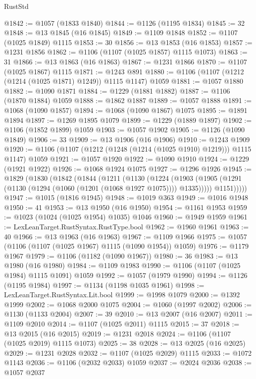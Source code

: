 \begin{lexlean}{RustStd}
\begin{coremodule}
@1842 := @1057 (@1833 @1840)
@1844 := @1126 (@1195 @1834)
@1845 := 32
@1848 := @13 @1845 (@16 @1845)
@1849 := @1109 @1848
@1852 := @1107 (@1025 @1849) @1115
@1853 := 30
@1856 := @13 @1853 (@16 @1853)
@1857 := @1231 @1856
@1862 := @1106 (@1107 (@1025 @1857) @1115 @1073)
@1863 := 31
@1866 := @13 @1863 (@16 @1863)
@1867 := @1231 @1866
@1870 := @1107 (@1025 @1867) @1115
@1871 := @1243 @891
@1880 := @1106 (@1107 (@1212 (@1214 (@1025 @1871) @1249)) @1115 @1147) @1059
@1881 := @1057 @1880
@1882 := @1090 @1871
@1884 := @1229 (@1881 @1882)
@1887 := @1106 (@1870 @1884) @1059
@1888 := @1862 @1887
@1889 := @1057 @1888
@1891 := @1068 (@1090 @1857)
@1894 := @1068 (@1090 @1867) @1075
@1895 := @1891 @1894
@1897 := @1269 @1895 @1079
@1899 := @1229 (@1889 @1897)
@1902 := @1106 (@1852 @1899) @1059
@1903 := @1057 @1902
@1905 := @1126 (@1090 @1849)
@1906 := 33
@1909 := @13 @1906 (@16 @1906)
@1910 := @1243 @1909
@1920 := @1106 (@1107 (@1212 (@1248 (@1214 (@1025 @1910) @1219))) @1115 @1147) @1059
@1921 := @1057 @1920
@1922 := @1090 @1910
@1924 := @1229 (@1921 @1922)
@1926 := @1068 @1924 @1075
@1927 := @1296 @1926
@1945 := @1829
    (@1830
      (@1842
        (@1844
          (@1211
            (@1130
              (@1224
                (@1903 (@1905 (@1291 (@1130 (@1294 (@1060 (@1201 (@1068 @1927 @1075)))) @1335)))))
              @1151)))))
@1947 := @1015 (@1816 @1945)
@1948 := @1019 @363
@1949 := @1016 @1948
@1950 := 41
@1953 := @13 @1950 (@16 @1950)
@1954 := @1161 @1953
@1959 := @1023 (@1024 (@1025 @1954) @1035) @1046
@1960 := @1949 @1959
@1961 := LexLeanTarget.RustSyntax.RustType.bool
@1962 := @1960 @1961
@1963 := 40
@1966 := @13 @1963 (@16 @1963)
@1967 := @1109 @1966
@1975 := @1057 (@1106 (@1107 (@1025 @1967) @1115 (@1090 @1954)) @1059)
@1976 := @1179 @1967
@1979 := @1106 (@1182 (@1090 @1967))
@1980 := 36
@1983 := @13 @1980 (@16 @1980)
@1984 := @1109 @1983
@1990 := @1106 (@1107 (@1025 @1984) @1115 @1091) @1059
@1992 := @1057 (@1979 @1990)
@1994 := @1126 (@1195 @1984)
@1997 := @1134 (@1198 @1035 @1961)
@1998 := LexLeanTarget.RustSyntax.Lit.bool
@1999 := @1998 @1079
@2000 := @1392 @1999
@2002 := @1068 @2000 @1075
@2004 := @1060 (@1997 @2002)
@2006 := @1130 (@1133 @2004)
@2007 := 39
@2010 := @13 @2007 (@16 @2007)
@2011 := @1109 @2010
@2014 := @1107 (@1025 @2011) @1115
@2015 := 37
@2018 := @13 @2015 (@16 @2015)
@2019 := @1231 @2018
@2024 := @1106 (@1107 (@1025 @2019) @1115 @1073)
@2025 := 38
@2028 := @13 @2025 (@16 @2025)
@2029 := @1231 @2028
@2032 := @1107 (@1025 @2029) @1115
@2033 := @1072 @1143
@2036 := @1106 (@2032 @2033) @1059
@2037 := @2024 @2036
@2038 := @1057 @2037

\end{coremodule}
\end{lexlean}
